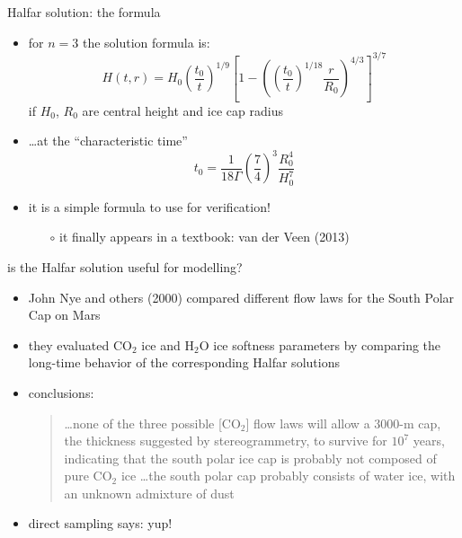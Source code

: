 \begin{frame}{Halfar solution: the formula}

\begin{itemize}
\item for $n=3$ the solution formula is:
  $$H(t,r) = H_0 \left(\frac{t_0}{t}\right)^{1/9} \left[1 - \left(\left(\frac{t_0}{t}\right)^{1/18} \frac{r}{R_0}\right)^{4/3}\right]^{3/7}$$
if $H_0$, $R_0$ are central height and ice cap radius
\item \dots at the ``characteristic time''
  $$t_0 = \frac{1}{18 \Gamma} \left(\frac{7}{4}\right)^3 \frac{R_0^4}{H_0^{7}}$$
\item it is a simple formula to use for verification!
    \begin{itemize}
    \item[$\circ$] it finally appears in a textbook: van der Veen (2013)
    \end{itemize}
\end{itemize}
\end{frame}


\begin{frame}{is the Halfar solution useful for modelling?}

\begin{itemize}
\item John Nye and others (2000) compared different flow laws for the South Polar Cap on Mars
\item they evaluated $\text{CO}_2$ ice and $\text{H}_2\text{O}$ ice softness parameters by comparing the long-time behavior of the corresponding Halfar solutions
\item conclusions:
  \begin{quote}
  \dots none of the three possible [$\text{CO}_2$] flow laws will allow a 3000-m cap, the thickness suggested by stereogrammetry, to survive for $10^7$ years, indicating that the south polar ice cap is probably not composed of pure $\text{CO}_2$ ice \dots the south polar cap probably consists of water ice, with an unknown admixture of dust
  \end{quote}
\item direct sampling says: yup!
\end{itemize}

\end{frame}


